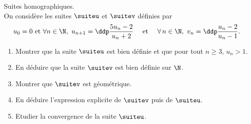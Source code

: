 
\begin{exercice}  \; Suites homographiques.\\
\noindent On consid\`ere les suites $\suiteu$ et $\suitev$ d\'efinies par
$$u_0=0\ \hbox{et}\ \forall n\in\N,\ u_{n+1}=\ddp\frac{5u_n-2}{u_n+2} \quad \textmd{ et } \quad \forall \, n \in \N, \ v_n = \ddp\frac{u_n-2}{u_n-1}.$$
\begin{enumerate}
 \item
Montrer que la suite $\suiteu$ est bien d\'efinie et que pour tout $n\geq 3$, $u_n>1$. 
\item 
En d\'eduire que la suite $\suitev$  est bien d\'efinie sur $\N$.
\item 
Montrer que $\suitev$ est g\'eom\'etrique.
\item 
En d\'eduire l'expression explicite de $\suitev$ puis de $\suiteu$.
\item Etudier la convergence de la suite $\suiteu$.
\end{enumerate}
\end{exercice}